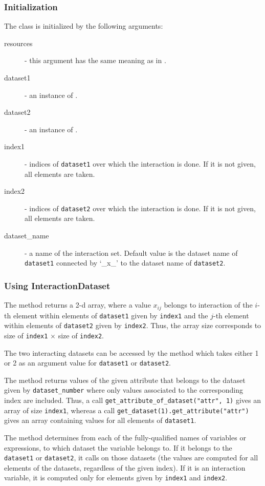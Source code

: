 \subsubsection{Initialization}
The class is initialized by the following arguments:
\begin{description}
\item[resources] - this argument has the same meaning as in . 
\item[dataset1] - an instance of . 
\item[dataset2] - an instance of . 
\item[index1] - indices of \verb|dataset1| over which the interaction is
  done. If it is not given, all elements are taken.
\item[index2] - indices of \verb|dataset2| over which the interaction is
  done. If it is not given, all elements are taken.
\item[dataset_name] - a name of the interaction set. Default value is the
  dataset name of  \verb|dataset1| connected by `_x_' to the dataset name of
  \verb|dataset2|.
\end{description}

\subsubsection{Using InteractionDataset}
%
The method  returns a 2-d array, where a value
$x_{ij}$ belongs to interaction of the $i$-th element within elements of
\verb|dataset1| given by \verb|index1| and the $j$-th element within
elements of \verb|dataset2| given by \verb|index2|. Thus, the array size
corresponds to size of \verb|index1| $\times$ size of \verb|index2|.

The two interacting datasets can be accessed by the method
 which takes either 1 or 2 as an argument value for
\verb|dataset1| or \verb|dataset2|.

The method  returns values of
the given attribute that belongs to the dataset given by  \verb|dataset_number| where
only values associated to the corresponding index are included. Thus, a
call \verb|get_attribute_of_dataset("attr", 1)| gives an array of size
\verb|index1|, whereas a call \verb|get_dataset(1).get_attribute("attr")|
gives an array containing values for all elements of \verb|dataset1|.

The method  determines from each of the fully-qualified
names of variables or expressions, to which dataset the variable belongs to. If it belongs to
the \verb|dataset1| or \verb|dataset2|, it calls  on
those datasets (the values are computed for all elements of the datasets,
regardless of the given index). If it is an interaction variable, it is
computed only for elements given by \verb|index1| and \verb|index2|.

